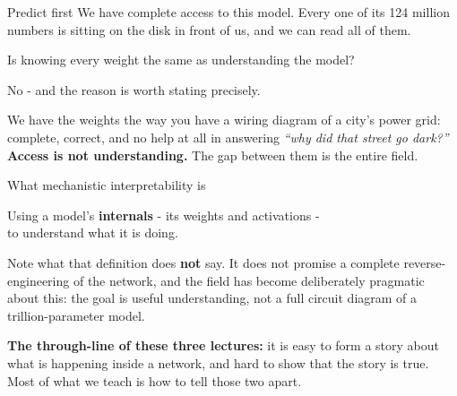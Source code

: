 \documentclass[aspectratio=169]{beamer}
\newcommand{\trapbox}[1]{%
  \begin{tcolorbox}[colback=armred!8, colframe=armred, boxrule=0.6pt, arc=2pt]
  #1
  \end{tcolorbox}}
\newcommand{\takebox}[1]{%
  \begin{tcolorbox}[colback=paramgreen!8, colframe=paramgreen, boxrule=0.6pt, arc=2pt]
  #1
  \end{tcolorbox}}
\begin{document}
\begin{frame}{Predict first}
  \vspace{0.6em}
  We have complete access to this model. Every one of its 124 million numbers is sitting on
  the disk in front of us, and we can read all of them.

  \vspace{1.1em}
  \begin{center}
    {\large Is knowing every weight the same as understanding the model?}
  \end{center}

  \vspace{1.1em}
  \pause
  No - and the reason is worth stating precisely.

  \vspace{0.5em}
  \trapbox{We have the weights the way you have a wiring diagram of a city's power grid: complete,
  correct, and no help at all in answering \emph{``why did that street go dark?''}
  \textbf{Access is not understanding.} The gap between them is the entire field.}
\end{frame}

\begin{frame}{What mechanistic interpretability is}
  \vspace{1.0em}
  \begin{center}
  \begin{tcolorbox}[colback=armblue!8, colframe=armblue, boxrule=0.8pt, arc=3pt, width=0.9\textwidth]
    \centering\large
    Using a model's \textbf{internals} - its weights and activations -\\ to understand what it
    is doing.
  \end{tcolorbox}
  \end{center}

  \vspace{1.0em}
  Note what that definition does \textbf{not} say. It does not promise a complete
  reverse-engineering of the network, and the field has become deliberately pragmatic about
  this: the goal is useful understanding, not a full circuit diagram of a trillion-parameter
  model.

  \vspace{0.9em}
  \takebox{\textbf{The through-line of these three lectures:} it is easy to form a story about
  what is happening inside a network, and hard to show that the story is true. Most of what we
  teach is how to tell those two apart.}
\end{frame}
\end{document}
